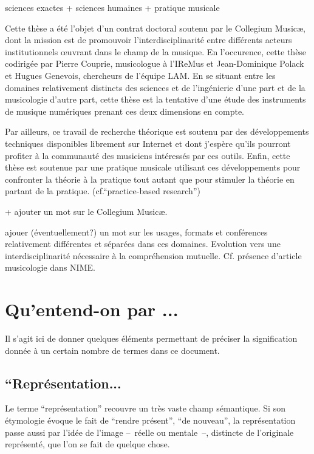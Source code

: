 sciences exactes + sciences humaines + pratique musicale

\noindent Cette thèse a été l'objet d'un contrat doctoral soutenu par le Collegium Musicæ, dont la mission est de promouvoir l'interdisciplinarité entre différents acteurs institutionnels œuvrant dans le champ de la musique. En l'occurence, cette thèse codirigée par Pierre Couprie, musicologue à l'\gls{IReMus} et Jean-Dominique Polack et Hugues Genevois, chercheurs de l'équipe \gls{LAM}.
En se situant entre les domaines relativement distincts des sciences et de l'ingénierie d'une part et de la musicologie d'autre part, cette thèse est la tentative d'une étude des instruments de musique numériques prenant ces deux dimensions en compte.

Par ailleurs, ce travail de recherche théorique est soutenu par des développements techniques disponibles librement sur Internet et dont j'espère qu'ils pourront profiter à la communauté des musiciens intéressés par ces outils.
Enfin, cette thèse est soutenue par une pratique musicale utilisant ces développements pour confronter la théorie à la pratique tout autant que pour stimuler la théorie en partant de la pratique. (cf.``practice-based research'')

+ ajouter un mot sur le Collegium Musicæ.

ajouer (éventuellement?) un mot sur les usages, formats et conférences relativement différentes et séparées dans ces domaines. 
Evolution vers une interdisciplinarité nécessaire à la compréhension mutuelle. Cf. présence d'article musicologie dans NIME.


\section{Qu'entend-on par ...}

Il s'agit ici de donner quelques éléments permettant de préciser la signification donnée à un certain nombre de termes dans ce document.

\subsection*{``Représentation...}

Le terme ``représentation'' recouvre un très vaste champ sémantique. Si son étymologie évoque le fait de ``rendre présent'', ``de nouveau'', la représentation passe aussi par l'idée de l'image --~réelle ou mentale~--, distincte de l'originale représenté, que l'on se fait de quelque chose.


